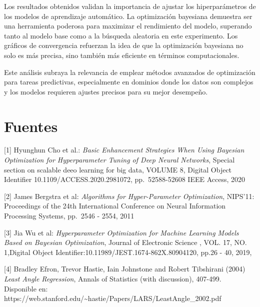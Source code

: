 \documentclass[
  12pt,
  letterpaper,
  DIV=11,
  numbers=noendperiod]{scrartcl}
\begin{document}
Los resultados obtenidos validan la importancia de ajustar los
hiperparámetros de los modelos de aprendizaje automático. La
optimización bayesiana demuestra ser una herramienta poderosa para
maximizar el rendimiento del modelo, superando tanto al modelo base como
a la búsqueda aleatoria en este experimento. Los gráficos de
convergencia refuerzan la idea de que la optimización bayesiana no solo
es más precisa, sino también más eficiente en términos computacionales.

Este análisis subraya la relevancia de emplear métodos avanzados de
optimización para tareas predictivas, especialmente en dominios donde
los datos son complejos y los modelos requieren ajustes precisos para su
mejor desempeño.

\section{Fuentes}\label{fuentes}

{[}1{]} Hyunghun Cho et al.: \emph{Basic Enhancement Strategies When
Using Bayesian Optimization for Hyperparameter Tuning of Deep Neural
Networks}, Special section on scalable deeo learning for big data,
VOLUME 8, Digital Object Identifier 10.1109/ACCESS.2020.2981072,
pp.~52588-52608 IEEE Access, 2020

{[}2{]} James Bergstra et al: \emph{Algorithms for Hyper-Parameter
Optimization}, NIPS'11: Proceedings of the 24th International Conference
on Neural Information Processing Systems, pp.~2546 - 2554, 2011

{[}3{]} Jia Wu et al: \emph{Hyperparameter Optimization for Machine
Learning Models Based on Bayesian Optimization}, Journal of Electronic
Science , VOL. 17, NO. 1,Digital Object
Identifier:10.11989/JEST.1674-862X.80904120, pp.26 - 40, 2019,

{[}4{]} Bradley Efron, Trevor Hastie, Iain Johnstone and Robert
Tibshirani (2004) \emph{Least Angle Regression}, Annals of Statistics
(with discussion), 407-499. Disponible en:
https://web.stanford.edu/\textasciitilde hastie/Papers/LARS/LeastAngle\_2002.pdf
\end{document}
